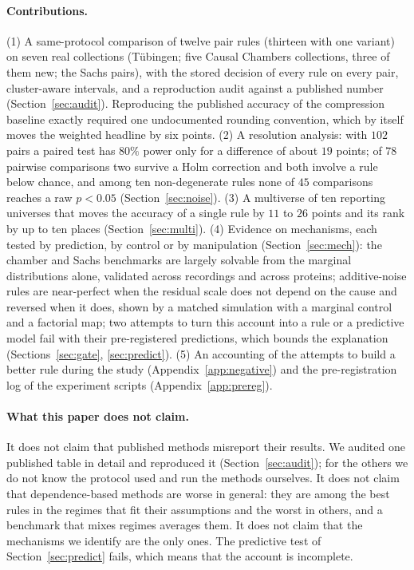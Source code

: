 \paragraph{Contributions.} (1) A same-protocol comparison of twelve pair rules (thirteen with one variant) on seven real collections (T\"ubingen; five Causal Chambers collections, three of them new; the Sachs pairs), with the stored decision of every rule on every pair, cluster-aware intervals, and a reproduction audit against a published number (Section~\ref{sec:audit}). Reproducing the published accuracy of the compression baseline exactly required one undocumented rounding convention, which by itself moves the weighted headline by six points. (2) A resolution analysis: with $102$ pairs a paired test has $80\%$ power only for a difference of about $19$ points; of $78$ pairwise comparisons two survive a Holm correction and both involve a rule below chance, and among ten non-degenerate rules none of $45$ comparisons reaches a raw $p<0.05$ (Section~\ref{sec:noise}). (3) A multiverse of ten reporting universes that moves the accuracy of a single rule by $11$ to $26$ points and its rank by up to ten places (Section~\ref{sec:multi}). (4) Evidence on mechanisms, each tested by prediction, by control or by manipulation (Section~\ref{sec:mech}): the chamber and Sachs benchmarks are largely solvable from the marginal distributions alone, validated across recordings and across proteins; additive-noise rules are near-perfect when the residual scale does not depend on the cause and reversed when it does, shown by a matched simulation with a marginal control and a factorial map; two attempts to turn this account into a rule or a predictive model fail with their pre-registered predictions, which bounds the explanation (Sections~\ref{sec:gate}, \ref{sec:predict}). (5) An accounting of the attempts to build a better rule during the study (Appendix~\ref{app:negative}) and the pre-registration log of the experiment scripts (Appendix~\ref{app:prereg}).

\paragraph{What this paper does not claim.} It does not claim that published methods misreport their results. We audited one published table in detail and reproduced it (Section~\ref{sec:audit}); for the others we do not know the protocol used and run the methods ourselves. It does not claim that dependence-based methods are worse in general: they are among the best rules in the regimes that fit their assumptions and the worst in others, and a benchmark that mixes regimes averages them. It does not claim that the mechanisms we identify are the only ones. The predictive test of Section~\ref{sec:predict} fails, which means that the account is incomplete.


